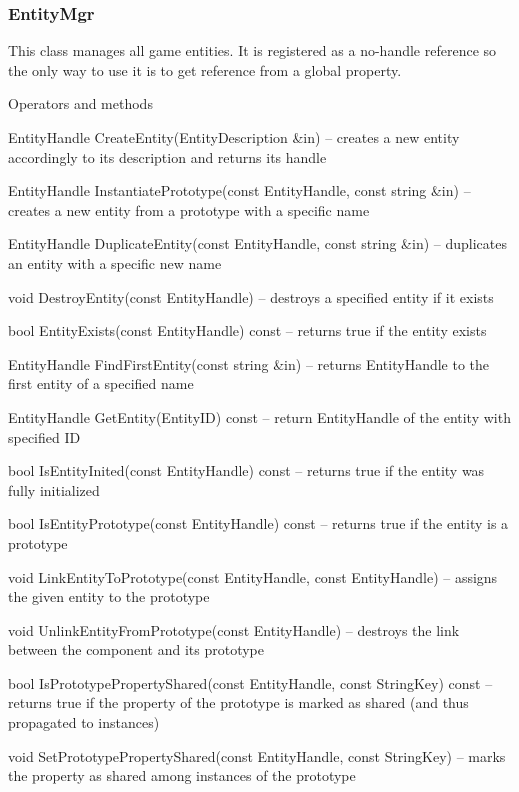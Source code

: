 \subsubsection{EntityMgr}

This class manages all game entities. It is registered as a no-handle reference so the only way to use it is to get reference from a global property.

\begin{titled-itemize}{Operators and methods}
  \item EntityHandle CreateEntity(EntityDescription \&in) -- creates a new entity accordingly to its description and returns its handle
  \item EntityHandle InstantiatePrototype(const EntityHandle, const string \&in) -- creates a new entity from a prototype with a specific name
  \item EntityHandle DuplicateEntity(const EntityHandle, const string \&in) -- duplicates an entity with a specific new name
  \item void DestroyEntity(const EntityHandle) -- destroys a specified entity if it exists
  \item bool EntityExists(const EntityHandle) const -- returns true if the entity exists
  \item EntityHandle FindFirstEntity(const string \&in) -- returns EntityHandle to the first entity of a specified name
  \item EntityHandle GetEntity(EntityID) const -- return EntityHandle of the entity with specified ID
  \item bool IsEntityInited(const EntityHandle) const -- returns true if the entity was fully initialized
  \item bool IsEntityPrototype(const EntityHandle) const -- returns true if the entity is a prototype
  \item void LinkEntityToPrototype(const EntityHandle, const EntityHandle) -- assigns the given entity to the prototype
  \item void UnlinkEntityFromPrototype(const EntityHandle) -- destroys the link between the component and its prototype
  \item bool IsPrototypePropertyShared(const EntityHandle, const String\-Key) const -- returns true if the property of the prototype is marked as shared (and thus propagated to instances)
  \item void SetPrototypePropertyShared(const EntityHandle, const String\-Key) -- marks the property as shared among instances of the prototype

\end{titled-itemize}
